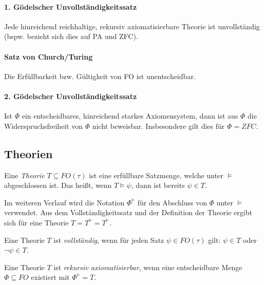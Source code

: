 \paragraph*{1. Gödelscher Unvollständigkeitssatz}
Jede hinreichend reichhaltige, rekursiv axiomatisierbare Theorie ist unvollständig (bspw. bezieht sich dies auf PA und ZFC).

\paragraph*{Satz von Church/Turing}
Die Erfüllbarkeit bzw. Gültigkeit von FO ist unentscheidbar.

\paragraph*{2. Gödelscher Unvollständigkeitssatz}
Ist $\Phi$ ein entscheidbares, hinreichend starkes Axiomensystem, dann ist aus $\Phi$ die Widerspruchsfreiheit von $\Phi$ nicht beweisbar. Insbesondere gilt dies für $\Phi=ZFC$.

\subsection{Theorien}

\begin{definition}[Theorie]
	Eine \textit{Theorie} $T\subseteq FO(\tau)$ ist eine erfüllbare Satzmenge, welche unter $\models$ abgeschlossen ist. Das heißt, wenn $T\models \psi$, dann ist bereits $\psi\in T$.
\end{definition}

Im weiteren Verlauf wird die Notation $\Phi^{\models}$ für den Abschluss von $\Phi$ unter $\models$ verwendet. 
Aus dem Vollständigkeitssatz und der Definition der Theorie ergibt sich für eine Theorie $T=T^{\models}=T^\vdash$.

\begin{definition}[Vollständigkeit]
	Eine Theorie $T$ ist \textit{vollständig}, wenn für jeden Satz $\psi\in FO(\tau)$ gilt: $\psi\in T$ oder $\neg\psi\in T$.
\end{definition}

\begin{definition}
	Eine Theorie $T$ ist \textit{rekursiv axiomatisierbar}, wenn eine entscheidbare Menge 
	$\Phi\subseteq FO$ existiert 
	mit $\Phi^{\models}=T$.
\end{definition}

